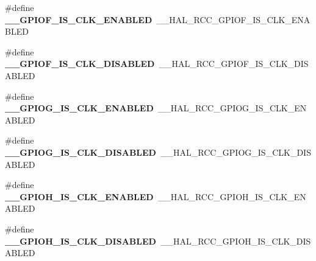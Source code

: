 \begin{DoxyCompactItemize}
\item 
\#define {\bfseries \+\_\+\+\_\+\+G\+P\+I\+O\+F\+\_\+\+I\+S\+\_\+\+C\+L\+K\+\_\+\+E\+N\+A\+B\+L\+ED}~\+\_\+\+\_\+\+H\+A\+L\+\_\+\+R\+C\+C\+\_\+\+G\+P\+I\+O\+F\+\_\+\+I\+S\+\_\+\+C\+L\+K\+\_\+\+E\+N\+A\+B\+L\+ED\hypertarget{group___h_a_l___r_c_c___aliased_ga67876589bb01694e6817533ed88a16ff}{}\label{group___h_a_l___r_c_c___aliased_ga67876589bb01694e6817533ed88a16ff}

\item 
\#define {\bfseries \+\_\+\+\_\+\+G\+P\+I\+O\+F\+\_\+\+I\+S\+\_\+\+C\+L\+K\+\_\+\+D\+I\+S\+A\+B\+L\+ED}~\+\_\+\+\_\+\+H\+A\+L\+\_\+\+R\+C\+C\+\_\+\+G\+P\+I\+O\+F\+\_\+\+I\+S\+\_\+\+C\+L\+K\+\_\+\+D\+I\+S\+A\+B\+L\+ED\hypertarget{group___h_a_l___r_c_c___aliased_gac51cb23651c45bb726d6f5cc73e110d7}{}\label{group___h_a_l___r_c_c___aliased_gac51cb23651c45bb726d6f5cc73e110d7}

\item 
\#define {\bfseries \+\_\+\+\_\+\+G\+P\+I\+O\+G\+\_\+\+I\+S\+\_\+\+C\+L\+K\+\_\+\+E\+N\+A\+B\+L\+ED}~\+\_\+\+\_\+\+H\+A\+L\+\_\+\+R\+C\+C\+\_\+\+G\+P\+I\+O\+G\+\_\+\+I\+S\+\_\+\+C\+L\+K\+\_\+\+E\+N\+A\+B\+L\+ED\hypertarget{group___h_a_l___r_c_c___aliased_ga0ddda8d7d817c15069062563b279db04}{}\label{group___h_a_l___r_c_c___aliased_ga0ddda8d7d817c15069062563b279db04}

\item 
\#define {\bfseries \+\_\+\+\_\+\+G\+P\+I\+O\+G\+\_\+\+I\+S\+\_\+\+C\+L\+K\+\_\+\+D\+I\+S\+A\+B\+L\+ED}~\+\_\+\+\_\+\+H\+A\+L\+\_\+\+R\+C\+C\+\_\+\+G\+P\+I\+O\+G\+\_\+\+I\+S\+\_\+\+C\+L\+K\+\_\+\+D\+I\+S\+A\+B\+L\+ED\hypertarget{group___h_a_l___r_c_c___aliased_ga23da605d52cb9d8ead303c3a4cee0e0f}{}\label{group___h_a_l___r_c_c___aliased_ga23da605d52cb9d8ead303c3a4cee0e0f}

\item 
\#define {\bfseries \+\_\+\+\_\+\+G\+P\+I\+O\+H\+\_\+\+I\+S\+\_\+\+C\+L\+K\+\_\+\+E\+N\+A\+B\+L\+ED}~\+\_\+\+\_\+\+H\+A\+L\+\_\+\+R\+C\+C\+\_\+\+G\+P\+I\+O\+H\+\_\+\+I\+S\+\_\+\+C\+L\+K\+\_\+\+E\+N\+A\+B\+L\+ED\hypertarget{group___h_a_l___r_c_c___aliased_ga7447541153d72d8e96a5939e751d2b12}{}\label{group___h_a_l___r_c_c___aliased_ga7447541153d72d8e96a5939e751d2b12}

\item 
\#define {\bfseries \+\_\+\+\_\+\+G\+P\+I\+O\+H\+\_\+\+I\+S\+\_\+\+C\+L\+K\+\_\+\+D\+I\+S\+A\+B\+L\+ED}~\+\_\+\+\_\+\+H\+A\+L\+\_\+\+R\+C\+C\+\_\+\+G\+P\+I\+O\+H\+\_\+\+I\+S\+\_\+\+C\+L\+K\+\_\+\+D\+I\+S\+A\+B\+L\+ED\hypertarget{group___h_a_l___r_c_c___aliased_ga4e5617180a05e001e52000706cf4d14a}{}\label{group___h_a_l___r_c_c___aliased_ga4e5617180a05e001e52000706cf4d14a}


\end{DoxyCompactItemize}
